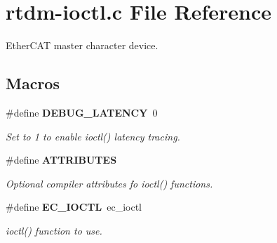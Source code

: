 \section{rtdm-\/ioctl.c File Reference}
\label{rtdm-ioctl_8c}


Ether\-C\-A\-T master character device.  


\subsection*{Macros}
\begin{DoxyCompactItemize}
\item 
\#define {\bf D\-E\-B\-U\-G\-\_\-\-L\-A\-T\-E\-N\-C\-Y}~0
\begin{DoxyCompactList}\small\item\em Set to 1 to enable ioctl() latency tracing. \end{DoxyCompactList}\item 
\#define {\bf A\-T\-T\-R\-I\-B\-U\-T\-E\-S}\label{rtdm-ioctl_8c_ae456bc7dfd6c3d54bccef2e234ecae7a}

\begin{DoxyCompactList}\small\item\em Optional compiler attributes fo ioctl() functions. \end{DoxyCompactList}\item 
\#define {\bf E\-C\-\_\-\-I\-O\-C\-T\-L}~ec\-\_\-ioctl\label{rtdm-ioctl_8c_a80a51dad3458ecb73d12369fa9b50a02}

\begin{DoxyCompactList}\small\item\em ioctl() function to use. \end{DoxyCompactList}\end{DoxyCompactItemize}
